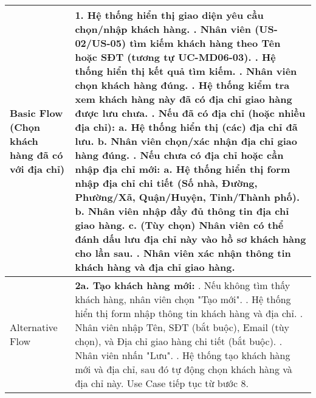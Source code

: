 \begin{longtable}{|m{4cm}|p{11cm}|}
Basic Flow (Chọn khách hàng đã có với địa chỉ) & 1. Hệ thống hiển thị giao diện yêu cầu chọn/nhập khách hàng. \newline 2. Nhân viên (US-02/US-05) tìm kiếm khách hàng theo Tên hoặc SĐT (tương tự UC-MD06-03). \newline 3. Hệ thống hiển thị kết quả tìm kiếm. \newline 4. Nhân viên chọn khách hàng đúng. \newline 5. Hệ thống kiểm tra xem khách hàng này đã có địa chỉ giao hàng được lưu chưa. \newline 6. \textbf{Nếu đã có địa chỉ (hoặc nhiều địa chỉ):} \newline    a. Hệ thống hiển thị (các) địa chỉ đã lưu. \newline    b. Nhân viên chọn/xác nhận địa chỉ giao hàng đúng. \newline 7. \textbf{Nếu chưa có địa chỉ hoặc cần nhập địa chỉ mới:} \newline    a. Hệ thống hiển thị form nhập địa chỉ chi tiết (Số nhà, Đường, Phường/Xã, Quận/Huyện, Tỉnh/Thành phố). \newline    b. Nhân viên nhập đầy đủ thông tin địa chỉ giao hàng. \newline    c. (Tùy chọn) Nhân viên có thể đánh dấu lưu địa chỉ này vào hồ sơ khách hàng cho lần sau. \newline 8. Nhân viên xác nhận thông tin khách hàng và địa chỉ giao hàng. \\
\hline
Alternative Flow & \textbf{2a. Tạo khách hàng mới:} \newline    1. Nếu không tìm thấy khách hàng, nhân viên chọn "Tạo mới". \newline    2. Hệ thống hiển thị form nhập thông tin khách hàng và địa chỉ. \newline    3. Nhân viên nhập Tên, SĐT (bắt buộc), Email (tùy chọn), và Địa chỉ giao hàng chi tiết (bắt buộc). \newline    4. Nhân viên nhấn "Lưu". \newline    5. Hệ thống tạo khách hàng mới và địa chỉ, sau đó tự động chọn khách hàng và địa chỉ này. Use Case tiếp tục từ bước 8. \\
\hline

\end{longtable}
